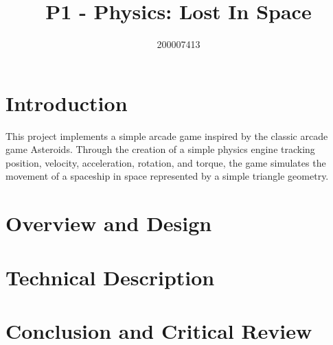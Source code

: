 \documentclass[12pt, a4paper]{article}
\title{P1 - Physics: Lost In Space}
\author{200007413}
\date{}
\begin{document}
{\bfseries\huge\thetitle}

{\large\theauthor}

\section{Introduction}

This project implements a simple arcade game inspired by the classic arcade game Asteroids. Through the creation of a simple physics engine tracking position, velocity, acceleration, rotation, and torque, the game simulates the movement of a spaceship in space represented by a simple triangle geometry.

\section{Overview and Design}

\section{Technical Description}

\section{Conclusion and Critical Review}
\end{document}

